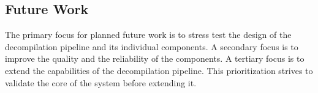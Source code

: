 
\subsection{Future Work}
\label{sec:future_work}

The primary focus for planned future work is to stress test the design of the decompilation pipeline and its individual components. A secondary focus is to improve the quality and the reliability of the components. A tertiary focus is to extend the capabilities of the decompilation pipeline. This prioritization strives to validate the core of the system before extending it.





